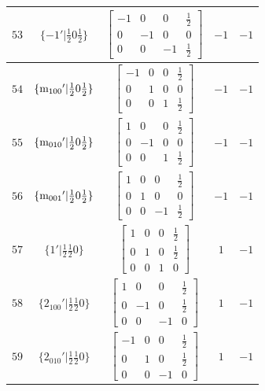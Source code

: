 \documentclass[fleqn,8pt]{jsarticle}
\begin{document}
\begin{longtable}{ccccc}
$ 53 $ & $ \{-1{}'|\frac{1}{2} 0 \frac{1}{2}\} $ & $ \begin{bmatrix} -1 & 0 & 0 & \frac{1}{2} \\ 0 & -1 & 0 & 0 \\ 0 & 0 & -1 & \frac{1}{2} \end{bmatrix} $ & $ -1 $ & $ -1 $ \\ \hline
$ 54 $ & $ \{{\rm m}_{100}{}'|\frac{1}{2} 0 \frac{1}{2}\} $ & $ \begin{bmatrix} -1 & 0 & 0 & \frac{1}{2} \\ 0 & 1 & 0 & 0 \\ 0 & 0 & 1 & \frac{1}{2} \end{bmatrix} $ & $ -1 $ & $ -1 $ \\ \hline
$ 55 $ & $ \{{\rm m}_{010}{}'|\frac{1}{2} 0 \frac{1}{2}\} $ & $ \begin{bmatrix} 1 & 0 & 0 & \frac{1}{2} \\ 0 & -1 & 0 & 0 \\ 0 & 0 & 1 & \frac{1}{2} \end{bmatrix} $ & $ -1 $ & $ -1 $ \\ \hline
$ 56 $ & $ \{{\rm m}_{001}{}'|\frac{1}{2} 0 \frac{1}{2}\} $ & $ \begin{bmatrix} 1 & 0 & 0 & \frac{1}{2} \\ 0 & 1 & 0 & 0 \\ 0 & 0 & -1 & \frac{1}{2} \end{bmatrix} $ & $ -1 $ & $ -1 $ \\ \hline
$ 57 $ & $ \{1{}'|\frac{1}{2} \frac{1}{2} 0\} $ & $ \begin{bmatrix} 1 & 0 & 0 & \frac{1}{2} \\ 0 & 1 & 0 & \frac{1}{2} \\ 0 & 0 & 1 & 0 \end{bmatrix} $ & $ 1 $ & $ -1 $ \\ \hline
$ 58 $ & $ \{2{}_{100}{}'|\frac{1}{2} \frac{1}{2} 0\} $ & $ \begin{bmatrix} 1 & 0 & 0 & \frac{1}{2} \\ 0 & -1 & 0 & \frac{1}{2} \\ 0 & 0 & -1 & 0 \end{bmatrix} $ & $ 1 $ & $ -1 $ \\ \hline
$ 59 $ & $ \{2{}_{010}{}'|\frac{1}{2} \frac{1}{2} 0\} $ & $ \begin{bmatrix} -1 & 0 & 0 & \frac{1}{2} \\ 0 & 1 & 0 & \frac{1}{2} \\ 0 & 0 & -1 & 0 \end{bmatrix} $ & $ 1 $ & $ -1 $ \\ \hline

\end{longtable}
\end{document}
